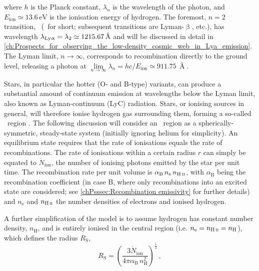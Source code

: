 \noindent where $h$ is the Planck constant, $\lambda_n$ is the wavelength of the photon, and $E_\text{ion} \simeq 13.6 \, \mathrm{eV}$ is the ionisation energy of hydrogen. The foremost, $n = 2$ transition, \lymana\ (\lya\ for short; subsequent transitions are Lyman-$\upbeta$, etc.), has wavelength $\lambda_\text{{Ly\ensuremath{\upalpha}}} = \lambda_2 \simeq 1215.67 \, \text{\AA}$ and will be discussed in detail in \cref{ch:Prospects_for_observing_the_low-density_cosmic_web_in_Lya_emission}. The Lyman limit, $n \rightarrow \infty$, corresponds to recombination directly to the ground level, releasing a photon at $\lim\limits_{n \rightarrow \infty} \lambda_n = hc/E_\text{ion} \simeq 911.75 \, \Angstrom$.

Stars, in particular the hotter (O- and B-type) variants, can produce a substantial amount of continuum emission at wavelengths below the Lyman limit, also known as Lyman-continuum (LyC) radiation. Stars, or ionising sources in general, will therefore ionise hydrogen gas surrounding them, forming a so-called \HII\ region \citep{1939ApJ....89..526S}. The following discussion will consider an \HII\ region as a spherically-symmetric, steady-state system (initially ignoring helium for simplicity). An equilibrium state requires that the rate of ionisations equals the rate of recombinations. The rate of ionisations within a certain radius $r$ can simply be equated to $\dot{N}_\text{ion}$, the number of ionising photons emitted by the star per unit time. The recombination rate per unit volume is $\alpha_\text{B} \, n_\text{e} \, n_\text{\HII}$, with $\alpha_\text{B}$ being the recombination coefficient (in case B, where only recombinations into an excited state are considered; see \cref{chPsssec:Recombination emissivity} for further details) and $n_\text{e}$ and $n_\text{\HII}$ the number densities of electrons and ionised hydrogen.

A further simplification of the model is to assume hydrogen has constant number density, $n_\text{H}$, and is entirely ionised in the central region (i.e. $n_\text{e} = n_\text{\HII} = n_\text{H}$), which defines the \citeauthor{1939ApJ....89..526S} radius $R_\text{S}$,
\begin{equation}
    \label{chIeq:Photoionisation_equilibrium}
    R_\text{S} = \left( \frac{3 \dot{N}_\text{ion}}{4 \pi \alpha_\text{B} \, n_\text{H}^2} \right)^\frac{1}{3} \, ,
\end{equation}

